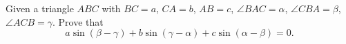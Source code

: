 Given a triangle  $ABC$ with $BC=a$, $CA=b$, $AB=c$, $\angle BAC = \alpha$, $\angle CBA = \beta$, $\angle ACB = \gamma$. Prove that $$ a \sin(\beta-\gamma) + b \sin(\gamma-\alpha) +c\sin(\alpha-\beta) = 0.$$